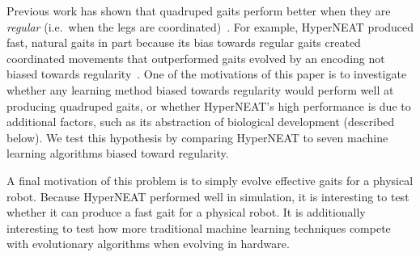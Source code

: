 Previous work has shown that quadruped gaits perform better when they are \emph{regular} (i.e.\ when the legs are coordinated)~\cite{clune2009evolving, clune2011performance,valsalam2008modular}. For example, HyperNEAT produced fast, natural gaits in part because its bias towards regular gaits created coordinated movements that outperformed gaits evolved by an encoding not biased towards regularity~\cite{clune2009evolving, clune2011performance}. One of the motivations of this paper is to investigate whether any learning method biased towards regularity would perform well at producing quadruped gaits, or whether HyperNEAT's high performance is due to additional factors, such as its abstraction of biological development (described below). We test this hypothesis by comparing HyperNEAT to seven machine learning algorithms biased toward regularity. 

A final motivation of this problem is to simply evolve effective gaits for a physical robot. Because HyperNEAT performed well in simulation, it is interesting to test whether it can produce a fast gait for a physical robot. It is additionally interesting to test how more traditional machine learning techniques compete with evolutionary algorithms when evolving in hardware.




%  
%  
% 

